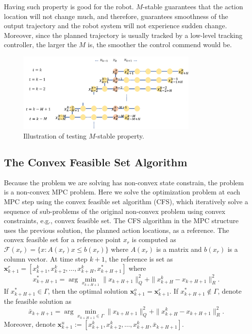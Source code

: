 \documentclass{ifacconf}
\begin{document}
Having such property is good for the robot. $M$-stable guarantees that the action location will not change much, and therefore, guarantees smoothness of the output trajectory and the robot system will not experience sudden change. Moreover, since the planned trajectory is usually tracked by a low-level tracking controller, the larger the $M$ is, the smoother the control commend would be.

\begin{figure}[htbp]
\begin{center}
\includegraphics[width=9cm]{src/Mstable.png}
\caption{Illustration of testing $M$-stable property.}
\label{fig:m-stable}
\end{center}
\end{figure}


\subsection{The Convex Feasible Set Algorithm}
Because the problem we are solving has non-convex state constrain, the problem is a non-convex MPC problem. Here we solve the optimization problem at each MPC step using the convex feasible set algorithm (CFS), which iteratively solve a sequence of sub-problems of the original non-convex problem using convex constraints, e.g., convex feasible set. The CFS algorithm in the MPC structure uses the previous solution, the planned action locations, as a reference. The convex feasible set for a reference point $x_r$ is computed as $\mathcal{F}(x_r) = \{x:A(x_r)x\leq b(x_r)\}$ where $A(x_r)$ is a matrix and $b(x_r)$ is a column vector. 
At time step $k+1$, the reference is set as $\mathbf{x}_{k+1}^{r}=[x_{k+1}^{k},x_{k+2}^{k},\ldots,x_{k+H}^k, x_{k+H+1}^*]$ where
\begin{equation}
x_{k+H+1}^* = \arg\min_{x_{k+H+1}} \|x_{k+H+1}\|_Q^2+\|x_{k+H}^k-x_{k+H+1}\|_R^2\text{.}
\end{equation}
If $x_{k+H+1}^*\in\Gamma$, then the optimal solution $\mathbf{x}_{k+1}^o = \mathbf{x}_{k+1}^r$.  If $x_{k+H+1}^*\notin\Gamma$, denote the feasible solution as 
\begin{equation}
\bar{x}_{k+H+1} = \arg\min_{x_{k+H+1}\in\Gamma} \|x_{k+H+1}\|_Q^2
+\|x_{k+H}^k-x_{k+H+1}\|_R^2\text{.}
\end{equation}
Moreover, denote $\mathbf{x}_{k+1}^{u}:=[x_{k+1}^{k},x_{k+2}^{k},\ldots,x_{k+H}^k, \bar x_{k+H+1}]$. 
\end{document}

